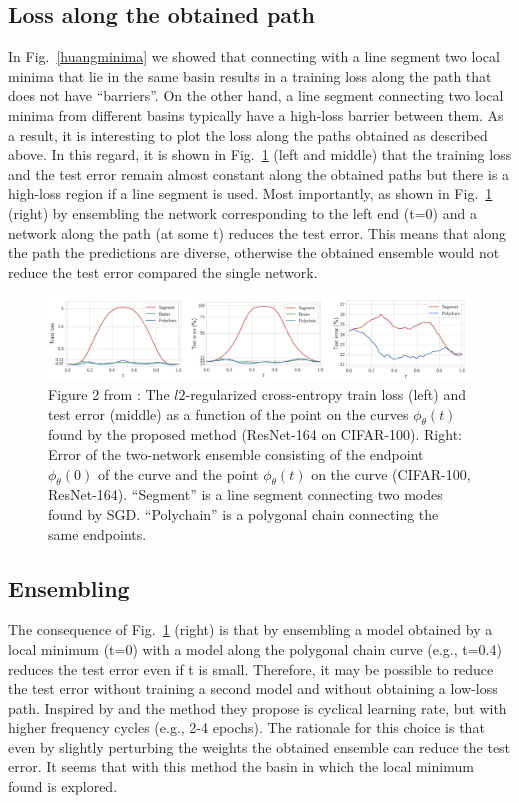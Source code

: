 \subsection{Loss along the obtained path}
In Fig.~\ref{huangminima} we showed that connecting with a line segment two local minima that lie in the same basin results in a training loss along the path that does not have ``barriers''.
On the other hand, a line segment connecting two local minima from different basins typically have a high-loss barrier between them.
As a result, it is interesting to plot the loss along the paths obtained as described above.
In this regard, it is shown in Fig.~\ref{lossalong} (left and middle) that the training loss and the test error remain almost constant along the obtained paths but there is a high-loss region if a line segment is used.
Most importantly, as shown in Fig.~\ref{lossalong} (right) by ensembling the network corresponding to the left end (t=0) and a network along the path (at some t) reduces the test error. 
This means that along the path the predictions are diverse, otherwise the obtained ensemble would not reduce the test error compared the single network.  
\begin{figure}[H]
	\centering
	\includegraphics[width=1\linewidth]{./Figures/lossalong.png}
	\caption{Figure 2 from \textcite{garipov2018loss}: The $l2$-regularized cross-entropy train loss (left) and test error (middle) as a function of the point on the curves $\phi_{\theta}(t)$ found by the proposed method (ResNet-164 on CIFAR-100). Right: Error of the two-network ensemble consisting of the endpoint $\phi_{\theta}(0)$ of the curve and the point $\phi_{\theta}(t)$ on the curve (CIFAR-100, ResNet-164). ``Segment'' is a line segment connecting two modes found by SGD. “Polychain” is a polygonal chain connecting the same endpoints.
}
	\label{lossalong}
\end{figure}

\subsection{Ensembling}

The consequence of Fig.~\ref{lossalong} (right) is that by ensembling a model obtained by a local minimum (t=0) with a model along the polygonal chain curve (e.g., t=0.4) reduces the test error even if t is small. 
Therefore, it may be possible to reduce the test error without training a second model and without obtaining a low-loss path. 
Inspired by \textcite{smith2017cyclical} and \textcite{huang2017snapshot} the method they propose is cyclical learning rate, but with higher frequency cycles (e.g., 2-4 epochs). 
The rationale for this choice is that even by slightly perturbing the weights the obtained ensemble can reduce the test error. 
It seems that with this method the basin in which the local minimum found is explored.

